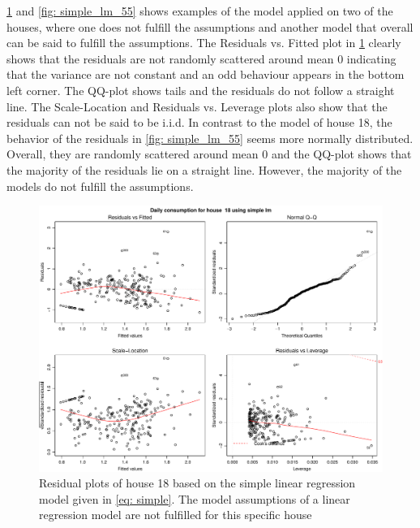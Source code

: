 \noindent \cref{fig: simple_lm_18} and \cref{fig: simple_lm_55} shows examples of the model applied on two of the houses, where one does not fulfill the assumptions and another model that overall can be said to fulfill the assumptions. The Residuals vs. Fitted plot in \cref{fig: simple_lm_18} clearly shows that the residuals are not randomly scattered around mean 0 indicating that the variance are not constant and an odd behaviour appears in the bottom left corner. The QQ-plot shows tails and the residuals do not follow a straight line. The Scale-Location and Residuals vs. Leverage plots also show that the residuals can not be said to be i.i.d. In contrast to the model of house 18, the behavior of the residuals in \cref{fig: simple_lm_55} seems more normally distributed. Overall, they are randomly scattered around mean 0 and the QQ-plot shows that the majority  of the residuals lie on a straight line. However, the majority of the models do not fulfill the assumptions.
\begin{figure}
    \centering
    \includegraphics[width=1.\textwidth]{../../../figures/simple_lm18.pdf}
    \caption{Residual plots of house 18 based on the simple linear regression model given in \cref{eq: simple}. The model assumptions of a linear regression model are not fulfilled for this specific house}
    \label{fig: simple_lm_18}
\end{figure}
